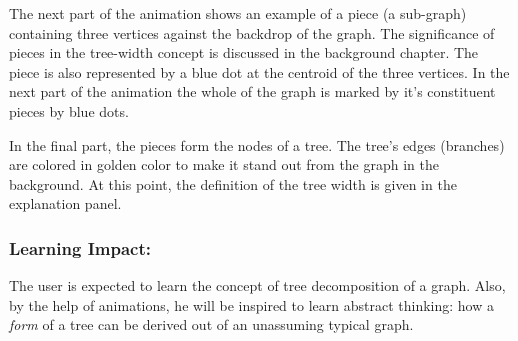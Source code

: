 The next part of the animation shows an example of a piece (a sub-graph)
containing three vertices against the backdrop of the graph. The significance
of pieces in the tree-width concept is discussed in the background chapter.
The piece is also represented by a blue dot at the centroid of the three
vertices. In the next part of the animation the whole of the graph is marked by
it's constituent pieces by blue dots. 

In the final part, the pieces form the nodes of a tree. The tree's edges
(branches) are colored in golden color to make it stand out from the graph in
the background. At this point, the definition of the tree width is given in
the explanation panel.

\subsubsection{Learning Impact:}
The user is expected to learn the concept of tree decomposition of a graph.
Also, by the help of animations, he will be inspired to learn abstract
thinking: how a \emph{form} of a tree can be derived out of an unassuming
typical graph.
